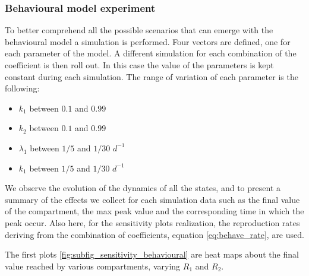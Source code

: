 \subsubsection{Behavioural model experiment}
To better comprehend all the possible scenarios that can emerge with the behavioural model a simulation is performed. Four vectors are defined, one for each parameter of the model. A different simulation for each combination of the coefficient is then roll out. In this case the value of the parameters is kept constant during each simulation.
The range of variation of each parameter is the following:
\begin{itemize}
	\item $k_1$ between $0.1$ and $0.99$
	\item $k_2$ between $0.1$ and $0.99$
	\item $\lambda_1$ between $1/5$ and $1/30$ $d^{-1}$
	\item $k_1$ between $1/5$ and $1/30$ $d^{-1}$
\end{itemize}
We observe the evolution of the dynamics of all the states, and to present a summary of the effects we collect for each simulation data such as the final value of the compartment, the max peak value and the corresponding time in which the peak occur. 
Also here, for the sensitivity plots realization, the reproduction rates deriving from the combination of coefficients, equation \ref{eq:behave_rate}, are used. 

The first plots \ref{fig:subfig_sensitivity_behavioural} are heat maps about the final value reached by various compartments, varying $R_1$ and $R_2$.

